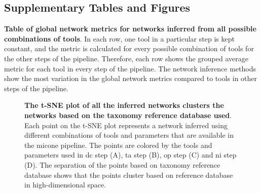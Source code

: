 \documentclass[letterpaper,12pt]{article}
\begin{document}
  \FloatBarrier
  \newpage
  \subsection*{Supplementary Tables and Figures}

  \renewcommand{\thefigure}{S\arabic{figure}}
  \setcounter{figure}{0}

  \renewcommand{\thetable}{S\arabic{table}}
  \setcounter{table}{0}

  \begin{table}[H]
    \centering
    \caption{
      \textbf{Table of global network metrics for networks inferred from all possible combinations of tools}.
      In each row, one tool in a particular step is kept constant, and the metric is calculated for every possible combination of tools for the other steps of the pipeline.
      Therefore, each row shows the grouped average metric for each tool in every step of the pipeline.
      The network inference methods show the most variation in the global network metrics compared to tools in other steps of the pipeline.
    }
    \label{tab:network_metrics}
  \end{table}


    \begin{figure}[H]
      \centering
        \caption{
          \textbf{The t-SNE plot of all the inferred networks clusters the networks based on the taxonomy reference database used}.
          Each point on the t-SNE plot represents a network inferred using different combinations of tools and parameters that are available in the \ac{micone} pipeline.
          The points are colored by the tools and parameters used in \ac{dc} step (A), \ac{ta} step (B), \ac{op} step (C) and \ac{ni} step (D).
          The separation of the points based on taxonomy reference database shows that the points cluster based on reference database in high-dimensional space.
        }
      \label{fig:figure_s1}
    \end{figure}
\end{document}
